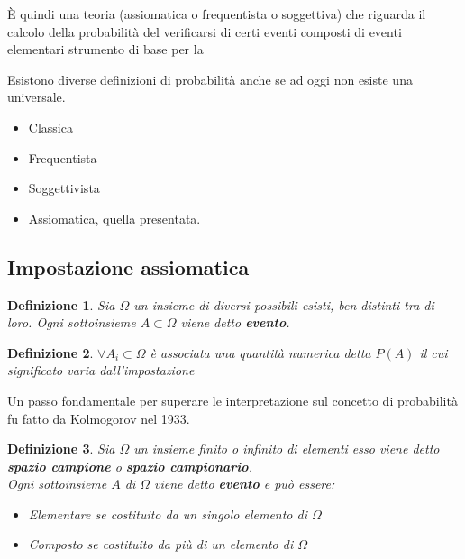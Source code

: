 \documentclass{article}
\newtheorem{definition}{Definizione}[section]
\begin{document}
         È quindi una teoria (assiomatica o frequentista o soggettiva) che riguarda il calcolo della probabilità del verificarsi di certi eventi composti di eventi elementari strumento di base per la
         
         Esistono diverse definizioni di probabilità anche se ad oggi non esiste una universale. 
         \begin{itemize}
             \item Classica
             \item Frequentista
             \item Soggettivista 
             \item Assiomatica, quella presentata. 
         \end{itemize}{}
         
         \subsection{Impostazione assiomatica}
         
         \begin{definition}{}
             Sia $\Omega$ un insieme di diversi possibili esisti, ben distinti tra di loro. Ogni sottoinsieme  $A\subset \Omega$ viene detto \textbf{evento}. \\
         \end{definition}
         
         \begin{definition}{}
            $\forall A_i \subset \Omega$ è associata una quantità numerica detta $P(A)$ il cui significato varia dall'impostazione
         \end{definition}
         
         Un passo fondamentale per superare le interpretazione sul concetto di probabilità fu fatto da Kolmogorov nel 1933.
         
          \begin{definition}{} 
          Sia $\Omega$ un insieme finito o infinito di elementi esso viene detto \textbf{spazio campione} o \textbf{spazio campionario}.\\
          Ogni sottoinsieme $A$ di $\Omega$ viene detto \textbf{evento} e può essere: 
         
          \begin{itemize}
              \item Elementare se costituito da un singolo elemento di $\Omega$
              \item Composto se costituito da più di un elemento di $\Omega$
          \end{itemize}{}
          
          \end{definition}
         
\end{document}
